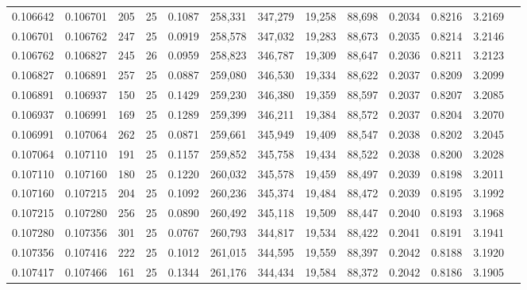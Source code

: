 \begin{tabular}{rrrrrrrrrrrrr}
0.106642 & 0.106701 &   205 &  25 &                                     0.1087 & 258,331 & 347,279 &  19,258 &  88,698 & 0.2034 & 0.8216 & 3.2169 \\
0.106701 & 0.106762 &   247 &  25 &                                     0.0919 & 258,578 & 347,032 &  19,283 &  88,673 & 0.2035 & 0.8214 & 3.2146 \\
0.106762 & 0.106827 &   245 &  26 &                                     0.0959 & 258,823 & 346,787 &  19,309 &  88,647 & 0.2036 & 0.8211 & 3.2123 \\
0.106827 & 0.106891 &   257 &  25 &                                     0.0887 & 259,080 & 346,530 &  19,334 &  88,622 & 0.2037 & 0.8209 & 3.2099 \\
0.106891 & 0.106937 &   150 &  25 &                                     0.1429 & 259,230 & 346,380 &  19,359 &  88,597 & 0.2037 & 0.8207 & 3.2085 \\
0.106937 & 0.106991 &   169 &  25 &                                     0.1289 & 259,399 & 346,211 &  19,384 &  88,572 & 0.2037 & 0.8204 & 3.2070 \\
0.106991 & 0.107064 &   262 &  25 &                                     0.0871 & 259,661 & 345,949 &  19,409 &  88,547 & 0.2038 & 0.8202 & 3.2045 \\
0.107064 & 0.107110 &   191 &  25 &                                     0.1157 & 259,852 & 345,758 &  19,434 &  88,522 & 0.2038 & 0.8200 & 3.2028 \\
0.107110 & 0.107160 &   180 &  25 &                                     0.1220 & 260,032 & 345,578 &  19,459 &  88,497 & 0.2039 & 0.8198 & 3.2011 \\
0.107160 & 0.107215 &   204 &  25 &                                     0.1092 & 260,236 & 345,374 &  19,484 &  88,472 & 0.2039 & 0.8195 & 3.1992 \\
0.107215 & 0.107280 &   256 &  25 &                                     0.0890 & 260,492 & 345,118 &  19,509 &  88,447 & 0.2040 & 0.8193 & 3.1968 \\
0.107280 & 0.107356 &   301 &  25 &                                     0.0767 & 260,793 & 344,817 &  19,534 &  88,422 & 0.2041 & 0.8191 & 3.1941 \\
0.107356 & 0.107416 &   222 &  25 &                                     0.1012 & 261,015 & 344,595 &  19,559 &  88,397 & 0.2042 & 0.8188 & 3.1920 \\
0.107417 & 0.107466 &   161 &  25 &                                     0.1344 & 261,176 & 344,434 &  19,584 &  88,372 & 0.2042 & 0.8186 & 3.1905 \\

\end{tabular}
